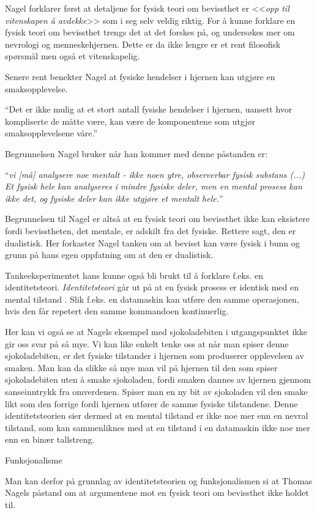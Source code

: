 Nagel forklarer først at detaljene for fysisk teori om bevissthet er <<\emph{opp til vitenskapen å avdekke}>> som i seg selv veldig riktig.
For å kunne forklare en fysisk teori om bevissthet trengs det at det forskes på,
og undersøkes mer om nevrologi og menneskehjernen. Dette er da ikke lengre er et rent filosofisk spørsmål men også et vitenskapelig.

Senere rent benekter Nagel at fysiske hendelser i hjernen kan utgjøre en smaksopplevelse.
\begin{pquotation}{\cite[36]{Nagel2003}}
    ``Det er ikke mulig at et stort antall fysiske hendelser i hjernen,
uansett hvor kompliserte de måtte være, 
kan være de komponentene som utgjør smaksopplevelsene våre.''
\end{pquotation}
Begrunnelsen Nagel bruker når han kommer med denne påstanden er:
\begin{pquotation}{\cite[36]{Nagel2003}}
``\textit{vi [må] analysere noe mentalt - ikke noen ytre, observerbar fysisk substans (...) 
Et fysisk hele kan analyseres i mindre fysiske deler, men en
mental prosess kan ikke det, og fysiske deler kan ikke utgjøre et mentalt hele.}''
\end{pquotation}
Begrunnelsen til Nagel er altså at en fysisk teori om bevissthet ikke kan eksistere fordi bevisstheten, 
det mentale, er adskilt fra det fysiske. Rettere sagt, den er dualistisk. 
Her forkaster Nagel tanken om at bevisst kan være fysisk i bunn og grunn på hans egen oppfatning om at den er dualistisk.

Tankeeksperimentet hans kunne også bli brukt til å forklare f.eks. en identitetsteori.
\textit{Identitetsteori} går ut på at en fysisk prosess er identisk med en mental tilstand \autocite{snl:identitetsteori}.
Slik f.eks. en datamaskin kan utføre den samme operasjonen,
hvis den får repetert den samme kommandoen kontinuerlig.

Her kan vi også se at Nagels eksempel med sjokoladebiten i utgangspunktet 
ikke gir oss svar på så mye.
Vi kan like enkelt tenke oss at når man spiser denne sjokoladebiten,
er det fysiske tilstander i hjernen som produserer opplevelsen av smaken. 
Man kan da slikke så mye man vil på hjernen til den som spiser sjokoladebiten 
uten å smake sjokoladen, fordi smaken dannes av hjernen gjennom sanseinntrykk fra omverdenen.
Spiser man en ny bit av sjokoladen vil den smake likt som den forrige fordi hjernen 
utfører de samme fysiske tilstandene.
Denne identitetsteorien sier dermed at en mental tilstand er ikke noe mer enn en nevral tilstand,
som kan sammenliknes med at en tilstand i en datamaskin ikke noe mer enn en binær tallstreng.

Funksjonalisme 

Man kan derfor på grunnlag av identitetsteorien og funksjonalismen si at 
Thomas Nagels påstand om at argumentene mot en fysisk teori om bevissthet ikke holdet til.